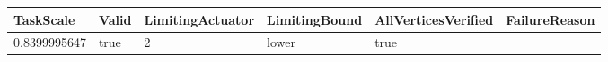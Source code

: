 \begin{tabular}{@{}llllll@{}}
\toprule
TaskScale & Valid & LimitingActuator & LimitingBound & AllVerticesVerified & FailureReason \\
\midrule
0.8399995647 & true & 2 & lower & true &  \\
\bottomrule
\end{tabular}
